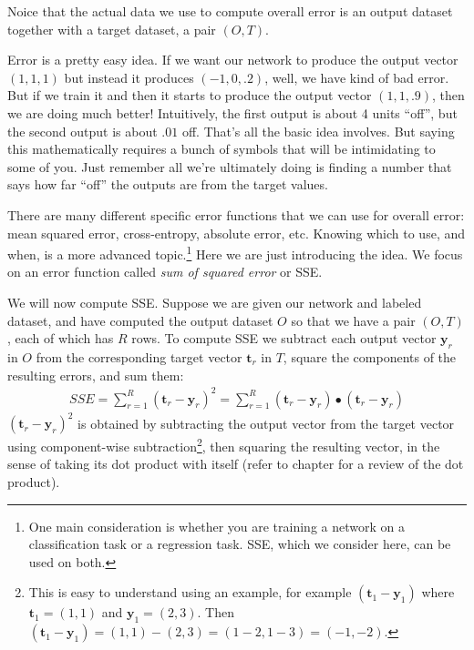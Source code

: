 Noice that the actual data we use to compute overall error is an output dataset together with a target dataset, \ie a pair $(O,T)$.


Error is a pretty easy idea. If we want our network to produce the output vector $(1,1,1)$ but instead it produces $(-1,0,.2)$, well, we have kind of bad error. But if we train it and then it starts to produce the output vector $(1,1,.9)$, then we are doing much better! Intuitively, the first output is about 4 units ``off'', but the second output is about $.01$ off. That's all the basic idea involves. But saying this mathematically requires a bunch of symbols that will be intimidating to some of you. Just remember all we're ultimately doing is finding a number that says how far ``off'' the outputs are from the target values.

There are many different specific error functions that we can use  for overall error: mean squared error, cross-entropy, absolute error, etc. Knowing which to use, and when, is a more advanced topic.\footnote{One main consideration is whether you are training a network on a classification task or a regression task. SSE, which we consider here, can be used on both.} Here we are just introducing the idea. We focus on an error function called \emph{sum of squared error} or SSE. 

We will now compute SSE. Suppose we are given our network and labeled dataset, and have computed the output dataset $O$ so that we have a pair $(O,T)$, each of which has $R$ rows. To compute SSE we subtract each output vector  $\mathbf{y}_r$ in $O$ from the corresponding target vector  $\mathbf{t}_r$ in $T$,  square the components of the resulting errors, and sum them:
\begin{eqnarray*}
SSE = \sum_{r=1}^{R}(\mathbf{t}_r - \mathbf{y}_r)^2 =  \sum_{r=1}^{R}(\mathbf{t}_r - \mathbf{y}_r) \bullet (\mathbf{t}_r - \mathbf{y}_r) 
\end{eqnarray*}
$(\mathbf{t}_r - \mathbf{y}_r)^2$ is obtained by subtracting the output vector from the target vector using component-wise subtraction\footnote{This is easy to understand using an example, for example $(\mathbf{t}_1 - \mathbf{y}_1)$ where $\mathbf{t}_1 = (1,1)$ and $\mathbf{y}_1 = (2,3)$. Then  $(\mathbf{t}_1 - \mathbf{y}_1) = (1,1) - (2,3) = (1-2,1-3) = (-1,-2)$.}, then squaring the resulting vector, in the sense of taking its dot product with itself (refer to chapter  for  a review of the dot product).

